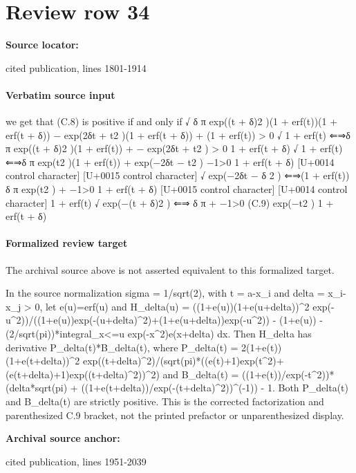 \documentclass[10pt]{article}
\begin{document}
\section*{Review row 34}
\textbf{Source locator:} {\footnotesize\raggedright cited publication, lines 1801-\allowbreak{}1914\par}
\paragraph{Verbatim source input}
\begin{ReviewVerbatim}
we get that (C.8) is positive if and only if
√
δ π exp((t + δ)2 )(1 + erf(t))(1 + erf(t + δ)) − exp(2δt + t2 )(1 + erf(t + δ)) + (1 + erf(t)) > 0
√
1 + erf(t)
⇐⇒δ π exp((t + δ)2 )(1 + erf(t)) +
− exp(2δt + t2 ) > 0
1 + erf(t + δ)
√
1 + erf(t)
⇐⇒δ π exp(t2 )(1 + erf(t)) + exp(−2δt − t2 )
−1>0
1 + erf(t + δ)
[U+0014 control character]
[U+0015 control character]
√
exp(−2δt − δ 2 )
⇐⇒(1 + erf(t)) δ π exp(t2 ) +
−1>0
1 + erf(t + δ)
[U+0015 control character]
[U+0014 control character]
1 + erf(t) √
exp(−(t + δ)2 )
⇐⇒
δ
π
+
−1>0
(C.9)
exp(−t2 )
1 + erf(t + δ)
\end{ReviewVerbatim}


\paragraph{Formalized review target}
The archival source above is not asserted equivalent to this formalized target.
\begin{ReviewVerbatim}
In the source normalization sigma = 1/sqrt(2), with t = a-x_i and delta = x_i-x_j > 0, let e(u)=erf(u) and H_delta(u) = ((1+e(u))(1+e(u+delta))^2 exp(-u^2))/((1+e(u))exp(-(u+delta)^2)+(1+e(u+delta))exp(-u^2)) - (1+e(u)) - (2/sqrt(pi))*integral_{x<=u} exp(-x^2)e(x+delta) dx. Then H_delta has derivative P_delta(t)*B_delta(t), where P_delta(t) = 2(1+e(t))(1+e(t+delta))^2 exp((t+delta)^2)/(sqrt(pi)*((e(t)+1)exp(t^2)+(e(t+delta)+1)exp((t+delta)^2))^2) and B_delta(t) = ((1+e(t))/exp(-t^2))*(delta*sqrt(pi) + ((1+e(t+delta))/exp(-(t+delta)^2))^(-1)) - 1. Both P_delta(t) and B_delta(t) are strictly positive. This is the corrected factorization and parenthesized C.9 bracket, not the printed prefactor or unparenthesized display.
\end{ReviewVerbatim}

\textbf{Archival source anchor:} {\footnotesize\raggedright cited publication, lines 1951-\allowbreak{}2039\par}
\end{document}
